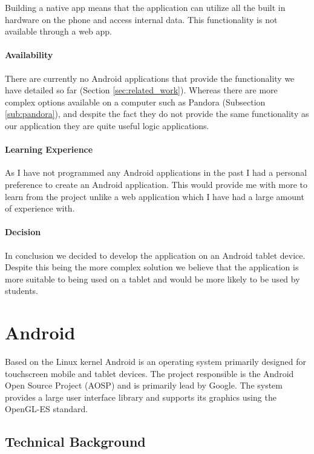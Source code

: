 \documentclass[draft]{report}
\begin{document}
Building a native app means that the application can utilize all the built in hardware on the phone and access internal data. This functionality is not available through a web app.

\subsubsection{Availability}

There are currently no Android applications that provide the functionality we have detailed so far (Section \ref{sec:related_work}). Whereas there are more complex options available on a computer such as Pandora (Subsection \ref{sub:pandora}), and despite the fact they do not provide the same functionality as our application they are quite useful logic applications. 

\subsubsection{Learning Experience}

As I have not programmed any Android applications in the past I had a personal preference to create an Android application. This would provide me with more to learn from the project unlike a web application which I have had a large amount of experience with.

\subsubsection{Decision}

In conclusion we decided to develop the application on an Android tablet device. Despite this being the more complex solution we believe that the application is more suitable to being used on a tablet and would be more likely to be used by students.

\chapter{Android}

Based on the Linux kernel Android is an operating system primarily designed for touchscreen mobile and tablet devices\cite{androidwiki}. The project responsible is the Android Open Source Project (AOSP) and is primarily lead by Google. The system provides a large user interface library and supports its graphics using the OpenGL-ES standard\cite{opengl}.

\section{Technical Background}
\end{document}
